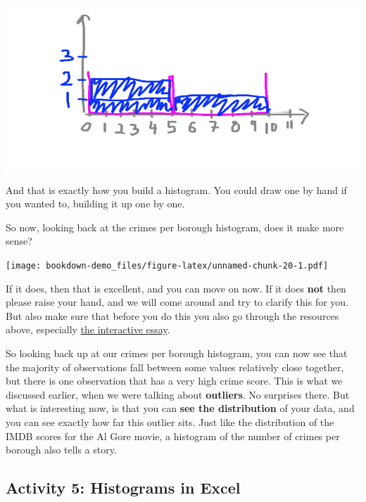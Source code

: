 \documentclass[]{book}
\theoremstyle{definition}
\theoremstyle{definition}
\theoremstyle{definition}
\theoremstyle{remark}
\begin{document}
\includegraphics{imgs/hist_fill_3.png}

And that is exactly how you build a histogram. You could draw one by
hand if you wanted to, building it up one by one.

So now, looking back at the crimes per borough histogram, does it make
more sense?

\texttt{[image: bookdown-demo\_files/figure-latex/unnamed-chunk-20-1.pdf]}

If it does, then that is excellent, and you can move on now. If it does
\textbf{not} then please raise your hand, and we will come around and
try to clarify this for you. But also make sure that before you do this
you also go through the resources above, especially
\href{http://tinlizzie.org/histograms/}{the interactive essay}.

So looking back up at our crimes per borough histogram, you can now see
that the majority of observations fall between some values relatively
close together, but there is one observation that has a very high crime
score. This is what we discussed earlier, when we were talking about
\textbf{outliers}. No surprises there. But what is interesting now, is
that you can \textbf{see the distribution} of your data, and you can see
exactly how far this outlier sits. Just like the distribution of the
IMDB scores for the Al Gore movie, a histogram of the number of crimes
per borough also tells a story.

\hypertarget{activity-5-histograms-in-excel}{%
\subsection{Activity 5: Histograms in
Excel}\label{activity-5-histograms-in-excel}}
\end{document}

